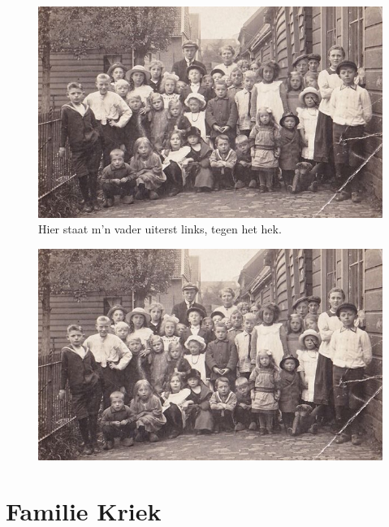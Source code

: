 \documentclass[12pt,twoside]{memoir}
\begin{document}
\begin{figure}
\includegraphics[width=\textwidth]{img/ch2/ch2-afb13}
\caption*{\footnotesize Hier staat m’n vader uiterst links, tegen het hek.}
\end{figure}

\begin{figure}
\includegraphics[width=\textwidth]{img/ch2/ch2-afb13}
\caption*{\footnotesize }
\end{figure}




\chapter{Familie Kriek} %
\label{cha:familie_kriek}
\end{document}
